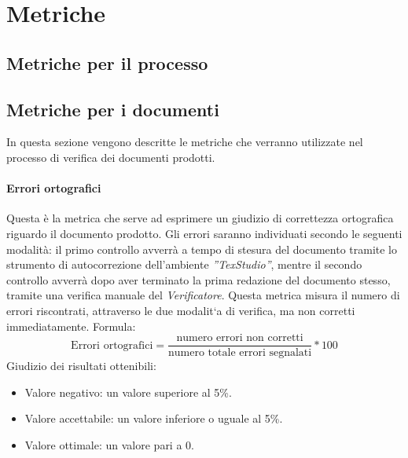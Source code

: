 \section{Metriche}
\subsection{Metriche per il processo}
\label{AppB:metricheProc}
\subsection{Metriche per i documenti}
\label{AppB:metricheDoc}
In questa sezione vengono descritte le metriche che verranno utilizzate nel processo di verifica dei documenti prodotti.
\paragraph{Errori ortografici}
Questa è la metrica che serve ad esprimere un giudizio di correttezza ortografica riguardo il documento prodotto. Gli errori saranno individuati secondo le seguenti modalità:
il primo controllo avverrà a tempo di stesura del documento tramite lo strumento di autocorrezione dell'ambiente \emph{''TexStudio''}, mentre il secondo controllo avverrà dopo aver terminato la prima redazione del documento stesso, tramite una verifica manuale del \emph{Verificatore}.
Questa metrica misura il numero di errori riscontrati, attraverso le due modalit`a di verifica, ma
non corretti immediatamente.
\newline Formula:
\begin{displaymath}
\mbox{Errori ortografici}= \frac{\mbox{numero errori non corretti}}{\mbox{numero totale errori segnalati}}*100
\end{displaymath}
Giudizio dei risultati ottenibili:
\begin{itemize}
	\item Valore negativo: un valore superiore al 5\%. 
	\item Valore accettabile: un valore inferiore o uguale al 5\%.
	\item Valore ottimale: un valore pari a 0.
\end{itemize}
